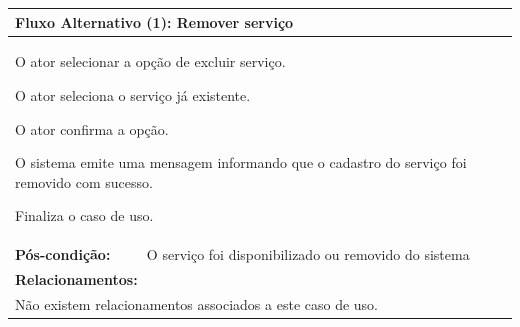 \documentclass[
	12pt,				%
	openright,
	oneside,			%
	a4paper,			%
	chapter=TITLE,		%
	brazil				%
	]{abntex2}
\begin{document}
\begin{table}[h]
\begin{tabular}{|p{3cm}|p{3cm}|p{3cm}|p{3cm}|}
\multicolumn{4}{|p{12cm}|}{\textbf{Fluxo Alternativo (1): Remover serviço}}                              					\\ \hline
\multicolumn{4}{|p{12cm}|}{%
\begin{alineas}
	\item O ator selecionar a opção de excluir serviço.
  	\item O ator seleciona o serviço já existente.
	\item O ator confirma a opção.
	\item O sistema emite uma mensagem informando que o cadastro do serviço foi removido com sucesso.
	\item Finaliza o caso de uso.
\end{alineas}}                                                               				 							\\ \hline

\textbf{Pós-condição: }  & \multicolumn{3}{p{9cm}|}{O serviço foi disponibilizado ou removido do sistema}		\\ \hline
\multicolumn{4}{|p{12cm}|}{\textbf{Relacionamentos:}}                                        								\\ \hline
\multicolumn{4}{|p{12cm}|}{Não existem relacionamentos associados a este caso de uso.}                                  \\ \hline
\end{tabular}
\end{table}
\end{document}
